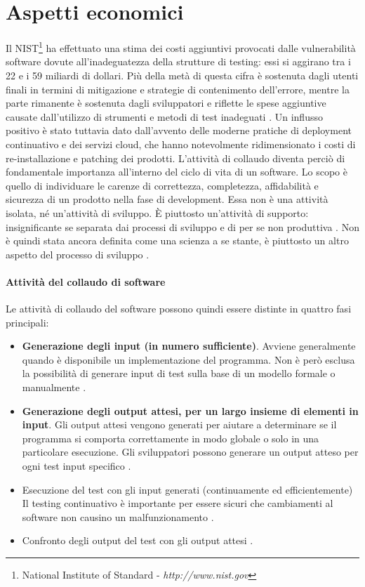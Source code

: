 \documentclass[../main.tex]{subfiles}
\begin{document}
\section{Aspetti economici}
Il NIST\footnote{National Institute of Standard - \textit{http://www.nist.gov}} ha effettuato una stima dei costi aggiuntivi provocati dalle vulnerabilità software dovute all'inadeguatezza della strutture di testing: essi si aggirano tra i 22 e i 59 miliardi di dollari. Più della metà di questa cifra è sostenuta dagli utenti finali in termini di mitigazione e strategie di contenimento dell'errore, mentre la parte rimanente è sostenuta dagli sviluppatori e riflette le spese aggiuntive causate dall'utilizzo di strumenti e metodi di test inadeguati \cite{NistEconomicImpact}. Un influsso positivo è stato tuttavia dato dall'avvento delle moderne pratiche di deployment continuativo e dei servizi cloud, che hanno notevolmente ridimensionato i costi di re-installazione e patching dei prodotti.\newline
L'attività di collaudo diventa perciò di fondamentale importanza all'interno del ciclo di vita di un software. Lo scopo è quello di individuare le carenze di correttezza, completezza, affidabilità e sicurezza di un prodotto nella fase di development.
Essa non è una attività isolata, né un'attività di sviluppo. È piuttosto un'attività di supporto: insignificante se separata dai processi di sviluppo e di per se non produttiva \cite{GAST}.\newline
Non è quindi stata ancora definita come una scienza a se stante, è piuttosto un altro aspetto del processo di sviluppo \cite{ArtOfSwTesting}.
\paragraph{Attività del collaudo di software}
Le attività di collaudo del software possono quindi essere distinte in quattro fasi principali:
\begin{itemize}
\item \textbf{Generazione degli input (in numero sufficiente)}. Avviene generalmente quando è disponibile un implementazione del programma. Non è però esclusa la possibilità di generare input di test sulla base di un modello formale \cite{DickFaivre93} o manualmente \cite{XieDissertation}.
\item \textbf{Generazione degli output attesi, per un largo insieme di elementi in input}. Gli output attesi vengono generati per aiutare a determinare se il programma si comporta correttamente in modo globale o solo in una particolare esecuzione. Gli sviluppatori possono generare un output atteso per ogni test input specifico
\cite{XieDissertation} \cite{Panzl78}.
\item Esecuzione del test con gli input generati (continuamente ed efficientemente) Il testing continuativo è importante per essere sicuri che cambiamenti al software non causino un malfunzionamento \cite{XieDissertation}.
\item Confronto degli output del test con gli output  attesi
\cite{XieDissertation}.
\end{itemize}
\end{document}
